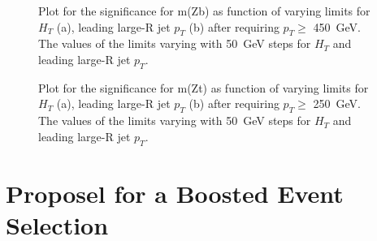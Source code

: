 \begin{figure}[h]
    \centering
    \caption{Plot for the significance for m(Zb) as function of varying limits for $H_{T}$ (a), leading large-R jet $p_{T}$ (b) after requiring $p_{T} \geq$ \SI{450}{GeV}.
    The values of the limits varying with \SI{50}{GeV} steps for $H_{T}$ and leading large-R jet $p_{T}$.}
    \label{mZbcutafterZpt}   
\end{figure}


\begin{figure}[h]
    \centering
    \caption{Plot for the significance for m(Zt) as function of varying limits for $H_{T}$ (a), leading large-R jet $p_{T}$ (b) after requiring $p_{T} \geq$ \SI{250}{GeV}.
    The values of the limits varying with \SI{50}{GeV} steps for $H_{T}$ and leading large-R jet $p_{T}$.}
    \label{mZtcutafterZpt}   
\end{figure}










\section{Proposel for a Boosted Event Selection}

